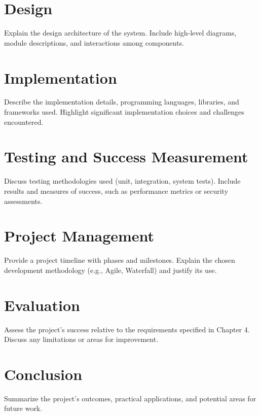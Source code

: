 \documentclass[12pt,a4paper]{report}
\begin{document}
\chapter{Design}
    Explain the design architecture of the system. Include high-level diagrams, module descriptions, and interactions among components.

\chapter{Implementation}
    Describe the implementation details, programming languages, libraries, and frameworks used. Highlight significant implementation choices and challenges encountered.

\chapter{Testing and Success Measurement}
    Discuss testing methodologies used (unit, integration, system tests). Include results and measures of success, such as performance metrics or security assessments.

\chapter{Project Management}
    Provide a project timeline with phases and milestones. Explain the chosen development methodology (e.g., Agile, Waterfall) and justify its use.

\chapter{Evaluation}
    Assess the project’s success relative to the requirements specified in Chapter 4. Discuss any limitations or areas for improvement.

\chapter{Conclusion}
    Summarize the project’s outcomes, practical applications, and potential areas for future work.
\end{document}
